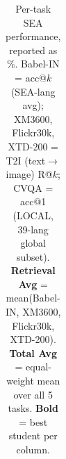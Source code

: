 \documentclass[11pt]{article}
\begin{document}
\begin{table}[h!]
{\begin{tabular}{l c ccc ccc ccc ccc ccc c ccc}
\bottomrule\end{tabular}
}
\caption{Per-task SEA performance, reported as \%.
  Babel-IN = acc@$k$ (SEA-lang avg); XM3600, Flickr30k, XTD-200 = T2I (text$\to$image) R@$k$;
  CVQA = acc@1 (LOCAL, 39-lang global subset).
  \textbf{Retrieval Avg} = mean(Babel-IN, XM3600, Flickr30k, XTD-200).
  \textbf{Total Avg} = equal-weight mean over all 5 tasks.
  \textbf{Bold} = best student per column.}
\label{tab:per_task_rk_t2i}
\end{table}
\end{document}
